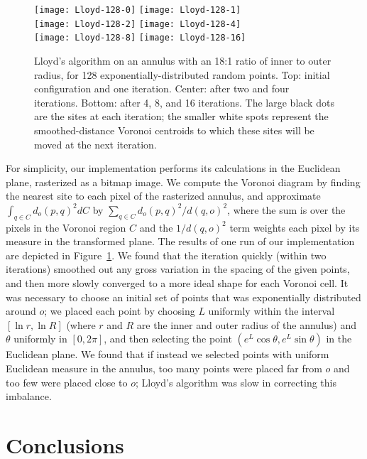 \documentclass[10pt, conference, compsocconf]{IEEEtran}
\begin{document}
\begin{figure}[t]
\centering
\texttt{[image: Lloyd-128-0]}\qquad
\texttt{[image: Lloyd-128-1]}\\[0.1in]
\texttt{[image: Lloyd-128-2]}\qquad
\texttt{[image: Lloyd-128-4]}\\[0.1in]
\texttt{[image: Lloyd-128-8]}\qquad
\texttt{[image: Lloyd-128-16]}
\caption{Lloyd's algorithm on an annulus with an 18:1 ratio of inner to outer radius, for 128 exponentially-distributed random points. Top: initial configuration and one iteration. Center: after two and four iterations. Bottom: after 4, 8, and 16 iterations. The large black dots are the sites at each iteration; the smaller white spots represent the smoothed-distance Voronoi centroids to which these sites will be moved at the next iteration.}
\label{fig:lloyd}
\end{figure}


For simplicity, our implementation performs its calculations in the Euclidean plane, rasterized as a bitmap image. We compute the Voronoi diagram by finding the nearest site to each pixel of the rasterized annulus, and approximate $\int_{q\in C} d_o(p,q)^2 dC$ by $\sum_{q\in C} d_o(p,q)^2/d(q,o)^2$, where the sum is over the pixels in the Voronoi region $C$ and the $1/d(q,o)^2$ term weights each pixel by its measure in the transformed plane. The results of one run of our implementation are depicted in Figure~\ref{fig:lloyd}. We found that the iteration quickly (within two iterations) smoothed out any gross variation in the spacing of the given points, and then more slowly converged to a more ideal shape for each Voronoi cell. It was necessary to choose an initial set of points that was exponentially distributed around $o$; we placed each point by choosing $L$ uniformly within the interval $[\ln r,\ln R]$ (where $r$ and $R$ are the inner and outer radius of the annulus) and $\theta$ uniformly in $[0,2\pi]$, and then selecting the point  $(e^L\cos\theta,e^L\sin\theta)$ in the Euclidean plane. We found that if instead we selected points with uniform Euclidean measure in the annulus, too many points were placed far from $o$ and too few were placed close to $o$; Lloyd's algorithm was slow in correcting this imbalance.

\section{Conclusions}
\end{document}
